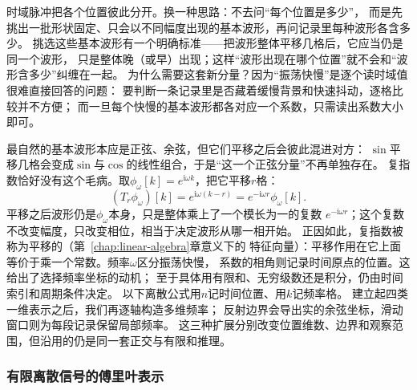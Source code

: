 时域脉冲把各个位置彼此分开。换一种思路：不去问“每个位置是多少”，
而是先挑出一批形状固定、只会以不同幅度出现的基本波形，再问记录里每种波形各含多少。
挑选这些基本波形有一个明确标准——把波形整体平移几格后，它应当仍是同一个波形，
只是整体晚（或早）出现；这样“波形出现在哪个位置”就不会和“波形含多少”纠缠在一起。
为什么需要这套新分量？因为“振荡快慢”是逐个读时域值很难直接回答的问题：
要判断一条记录里是否藏着缓慢背景和快速抖动，逐格比较并不方便；
而一旦每个快慢的基本波形都各对应一个系数，只需读出系数大小即可。

最自然的基本波形本应是正弦、余弦，但它们平移之后会彼此混进对方：
$\sin$平移几格会变成$\sin$与$\cos$的线性组合，于是“这一个正弦分量”不再单独存在。
复指数恰好没有这个毛病。取$\phi_\omega[k]=e^{\mathrm i\omega k}$，把它平移$r$格：
\[
  (T_r\phi_\omega)[k]
  =e^{\mathrm i\omega(k-r)}
  =e^{-\mathrm i\omega r}\phi_\omega[k].
\]
平移之后波形仍是$\phi_\omega$本身，只是整体乘上了一个模长为一的复数
$e^{-\mathrm i\omega r}$；这个复数不改变幅度，只改变相位，相当于决定波形从哪一相开始。
正因如此，复指数被称为平移的（第~\ref{chap:linear-algebra}章意义下的
特征向量）：平移作用在它上面等价于乘一个常数。频率$\omega$区分振荡快慢，
系数的相角则记录时间原点的位置。这给出了选择频率坐标的动机；
至于具体用有限和、无穷级数还是积分，仍由时间索引和周期条件决定。
以下离散公式用$n$记时间位置、用$k$记频率格。
建立起四类一维表示之后，我们再逐轴构造多维频率；
反射边界会导出实的余弦坐标，滑动窗口则为每段记录保留局部频率。
这三种扩展分别改变位置维数、边界和观察范围，但沿用的仍是同一套正交与有限和推理。

\subsubsection{有限离散信号的傅里叶表示}

